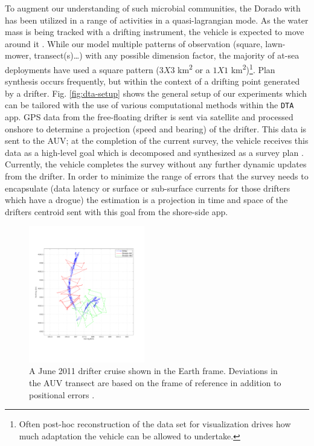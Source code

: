 To augment our understanding of such microbial communities, the Dorado
with \rx has been utilized in a range of activities in a
quasi-lagrangian mode. As the water mass is being tracked with a
drifting instrument, the vehicle is expected to move around it
. While our
model  multiple patterns of observation (square,
lawn-mower, transect(s)\dots) with any possible dimension factor, the
majority of at-sea deployments have used a square pattern ($3X3$
km\textsuperscript{2} or a $1X1$ km\textsuperscript{2})\footnote{Often
  post-hoc reconstruction of the data set for visualization drives how
  much adaptation the vehicle can be allowed to undertake.}. Plan
synthesis occurs frequently, but within the context of a drifting
point generated by a drifter. 
Fig. \ref{fig:dta-setup} shows the general setup of our experiments
which can be tailored with the use of various computational methods
within the \texttt{DTA} app. GPS data from the free-floating drifter
is sent via satellite and processed onshore to determine a projection
(speed and bearing) of the drifter. This data is sent to the AUV; at
the completion of the current survey, the vehicle receives this data
as a high-level goal which is decomposed and synthesized as a survey
plan . Currently, the vehicle
completes the survey without any further dynamic updates from the
drifter. In order to minimize the range of errors that the survey
needs to encapsulate (data latency or surface or sub-surface currents
for those drifters which have a drogue) the estimation is a projection
in time and space of the drifters centroid sent with this goal from
the shore-side app.

\begin{figure}[htpb]
\centering
\includegraphics[width=0.45\textwidth]{figs/june11-drifter-follow-180-181.pdf}
\caption{\small{A June 2011 drifter cruise shown in the Earth
    frame. Deviations in the AUV transect are based on the frame of
    reference in addition to positional errors \cite{das11b}.}}
\label{fig:drifter-errors}
\end{figure}


